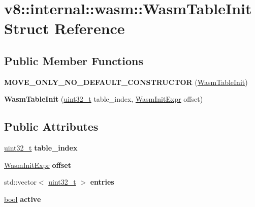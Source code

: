 \hypertarget{structv8_1_1internal_1_1wasm_1_1WasmTableInit}{}\section{v8\+:\+:internal\+:\+:wasm\+:\+:Wasm\+Table\+Init Struct Reference}
\label{structv8_1_1internal_1_1wasm_1_1WasmTableInit}
\subsection*{Public Member Functions}
\begin{DoxyCompactItemize}
\item 
\mbox{\label{structv8_1_1internal_1_1wasm_1_1WasmTableInit_a6a9fee8590aed7466210c31603b45fc0}} 
{\bfseries M\+O\+V\+E\+\_\+\+O\+N\+L\+Y\+\_\+\+N\+O\+\_\+\+D\+E\+F\+A\+U\+L\+T\+\_\+\+C\+O\+N\+S\+T\+R\+U\+C\+T\+OR} (\mbox{\hyperlink{structv8_1_1internal_1_1wasm_1_1WasmTableInit}{Wasm\+Table\+Init}})
\item 
\mbox{\label{structv8_1_1internal_1_1wasm_1_1WasmTableInit_aa389924d3cc5a5c608274ba77af74d8e}} 
{\bfseries Wasm\+Table\+Init} (\mbox{\hyperlink{classuint32__t}{uint32\+\_\+t}} table\+\_\+index, \mbox{\hyperlink{structv8_1_1internal_1_1wasm_1_1WasmInitExpr}{Wasm\+Init\+Expr}} offset)
\end{DoxyCompactItemize}
\subsection*{Public Attributes}
\begin{DoxyCompactItemize}
\item 
\mbox{\label{structv8_1_1internal_1_1wasm_1_1WasmTableInit_a26e2f8b9c1da5202b92fffab40912720}} 
\mbox{\hyperlink{classuint32__t}{uint32\+\_\+t}} {\bfseries table\+\_\+index}
\item 
\mbox{\label{structv8_1_1internal_1_1wasm_1_1WasmTableInit_abec0ae66446236b83caa5a9fea9ada7e}} 
\mbox{\hyperlink{structv8_1_1internal_1_1wasm_1_1WasmInitExpr}{Wasm\+Init\+Expr}} {\bfseries offset}
\item 
\mbox{\label{structv8_1_1internal_1_1wasm_1_1WasmTableInit_a98448f0cfc6b59cd3f8aabf292e350cd}} 
std\+::vector$<$ \mbox{\hyperlink{classuint32__t}{uint32\+\_\+t}} $>$ {\bfseries entries}
\item 
\mbox{\label{structv8_1_1internal_1_1wasm_1_1WasmTableInit_af0f6a89a3de56477b78d88e9a9f3fe89}} 
\mbox{\hyperlink{classbool}{bool}} {\bfseries active}
\end{DoxyCompactItemize}



